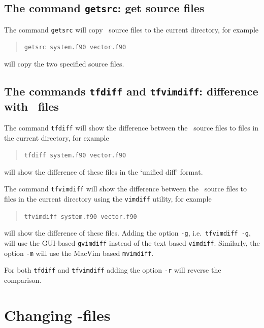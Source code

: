 \subsection{The command \texttt{getsrc}: get source files}

The command \texttt{getsrc} will copy \tfem\ source files to the current
directory, for example
\begin{quote}
   \texttt{getsrc system.f90 vector.f90}
\end{quote}
will copy the two specified source files.

\subsection{The commands \texttt{tfdiff} and \texttt{tfvimdiff}: difference with \tfem\ files}
\label{sec:tfdiff}

The command \texttt{tfdiff} will show the difference between the
\tfem\ source files to files in the current
directory, for example
\begin{quote}
   \texttt{tfdiff system.f90 vector.f90}
\end{quote}
will show the difference of these files in the `unified diff' format.

The command \texttt{tfvimdiff} will show the difference between the
\tfem\ source files to files in the current
directory using the \texttt{vimdiff} utility, for example
\begin{quote}
   \texttt{tfvimdiff system.f90 vector.f90}
\end{quote}
will show the difference of these files.
Adding the option \texttt{-g}, i.e.\ \texttt{tfvimdiff -g},
will use the GUI-based \texttt{gvimdiff} instead of 
the text based \texttt{vimdiff}. Similarly, the option \texttt{-m} will use the
MacVim based \texttt{mvimdiff}.

For both \texttt{tfdiff} and \texttt{tfvimdiff} adding the option \texttt{-r} will 
reverse the comparison.

\section{Changing \tfem-files}

